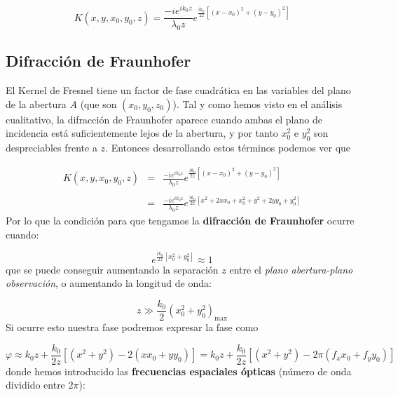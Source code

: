 \documentclass[12pt,a4paper]{book}
\numberwithin{equation}{section}
\numberwithin{figure}{section}
\newcommand{\ccorchetes}[1]{\left[ #1  \right]}
\newcommand{\1}{_{(1)}}
\newcommand{\2}{_{(2)}}
\theoremstyle{definition}
\begin{document}
\begin{equation}
    K(x,y,x_0,y_0,z) = \frac{-ie^{ik_0z}}{\lambda_0 z} e^{\frac{ik_0}{2z} \ccorchetes{(x-x_0)^2+(y-y_0)^2}}
\end{equation}

\subsection{Difracción de Fraunhofer}

El Kernel de Fresnel tiene un factor de fase cuadrática en las variables del plano de la abertura $A$ (que son $(x_0,y_0,z_0)$). Tal y como hemos visto en el análisis cualitativo, la difracción de Fraunhofer aparece cuando ambas el plano de incidencia está suficientemente lejos de la abertura, y por tanto $x_0^2$ e $y_0^2$ son despreciables frente a $z$. Entonces desarrollando estos términos podemos ver que 

\begin{equation}
\begin{array}{rll}
    K(x,y,x_0,y_0,z) &  = &  \frac{-i e^{ik_0z}}{\lambda_0 z} e^{\frac{ik_0}{2z} \ccorchetes{(x-x_0)^2+(y-y_0)^2}} \\ \\ & = & \frac{-i e^{ik_0z}}{\lambda_0 z}
     e^{\frac{ik_0}{2z} \ccorchetes{x^2+2xx_0+x_0^2+y^2+2yy_0+y_0^2}}    
\end{array}
\end{equation}
Por lo que la condición para que tengamos la \textbf{difracción de Fraunhofer} ocurre cuando:

\begin{equation}
     e^{\frac{ik_0}{2z} \ccorchetes{x_0^2+y_0^2}}   \approx 1  
\end{equation}
que se puede conseguir aumentando la separación $z$ entre el \textit{plano abertura-plano observación}, o aumentando la longitud de onda:

\begin{equation}
    z \gg \frac{k_0}{2} (x_0^2 + y_0^2)_{\max}
\end{equation}
Si ocurre esto nuestra fase podremos expresar la fase como

\begin{equation}
    \varphi \approx k_0 z + \frac{k_0}{2z} \ccorchetes{(x^2+y^2)-2(xx_0+yy_0)} = k_0z + \frac{k_0}{2z} \ccorchetes{(x^2+y^2)- 2 \pi (f_xx_0+f_yy_0)}
\end{equation}
donde hemos introducido las \textbf{frecuencias espaciales ópticas} (número de onda dividido entre $2\pi$):
\end{document}
